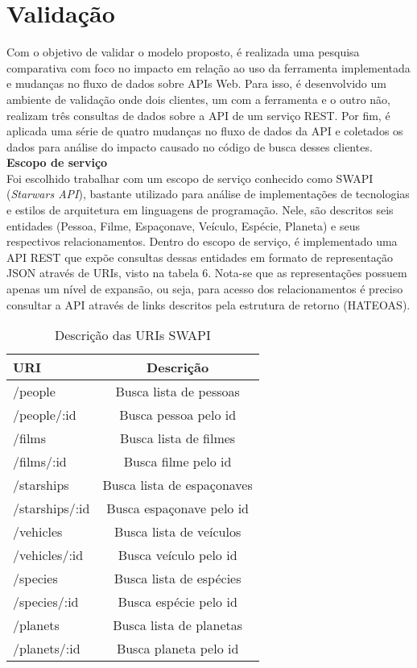 \chapter{Validação}

Com o objetivo de validar o modelo proposto, é realizada uma pesquisa comparativa com foco no impacto em relação ao uso da ferramenta implementada e mudanças no fluxo de dados sobre APIs Web. Para isso, é desenvolvido um ambiente de validação onde dois clientes, um com a ferramenta e o outro não, realizam três consultas de dados sobre a API de um serviço REST. Por fim, é aplicada uma série de quatro mudanças no fluxo de dados da API e coletados os dados para análise do impacto causado no código de busca desses clientes. \\

\textbf{Escopo de serviço} \\

Foi escolhido trabalhar com um escopo de serviço conhecido como SWAPI (\textit{Starwars API}), bastante utilizado para análise de implementações de tecnologias e estilos de arquitetura em linguagens de programação. Nele, são descritos seis entidades (Pessoa, Filme, Espaçonave, Veículo, Espécie, Planeta) e seus respectivos relacionamentos. Dentro do escopo de serviço, é implementado uma API REST que expõe consultas dessas entidades em formato de representação JSON através de URIs, visto na tabela 6. Nota-se que as representações possuem apenas um nível de expansão, ou seja, para acesso dos relacionamentos é preciso consultar a API através de links descritos pela estrutura de retorno (HATEOAS).

\begin{table}[H]
  \centering
  \begin{tabular}{|l|c|}
    \hline
    URI & Descrição \\
    \hline
    /people & Busca lista de pessoas \\
    \hline
    /people/:id & Busca pessoa pelo id \\
    \hline
    /films & Busca lista de filmes \\
    \hline
    /films/:id & Busca filme pelo id \\
    \hline
    /starships & Busca lista de espaçonaves \\
    \hline
    /starships/:id & Busca espaçonave pelo id \\
    \hline
    /vehicles & Busca lista de veículos \\
    \hline
    /vehicles/:id & Busca veículo pelo id \\
    \hline
    /species & Busca lista de espécies \\
    \hline
    /species/:id & Busca espécie pelo id \\
    \hline
    /planets & Busca lista de planetas \\
    \hline
    /planets/:id & Busca planeta pelo id \\
    \hline
  \end{tabular}
  \caption{Descrição das URIs SWAPI}
\end{table}

